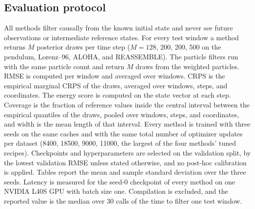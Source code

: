 \subsection{Evaluation protocol}\label{app:protocol}
All methods filter causally from the known initial state and never see future observations or intermediate reference states. For every test window a method returns $M$ posterior draws per time step ($M=128$, 200, 200, 500 on the pendulum, Lorenz--96, ALOHA, and REASSEMBLE). The particle filters run with the same particle count and return $M$ draws from the weighted particles. RMSE is computed per window and averaged over windows. CRPS is the empirical marginal CRPS of the draws, averaged over windows, steps, and coordinates. The energy score is computed on the state vector at each step. Coverage is the fraction of reference values inside the central interval between the empirical quantiles of the draws, pooled over windows, steps, and coordinates, and width is the mean length of that interval. Every method is trained with three seeds on the same caches and with the same total number of optimizer updates per dataset (8400, 18500, 9000, 11000, the largest of the four methods' tuned recipes). Checkpoints and hyperparameters are selected on the validation split, by the lowest validation RMSE unless stated otherwise, and no post-hoc calibration is applied. Tables report the mean and sample standard deviation over the three seeds. Latency is measured for the seed-0 checkpoint of every method on one NVIDIA L40S GPU with batch size one. Compilation is excluded, and the reported value is the median over 30 calls of the time to filter one test window.

\subsection{\method}\label{app:normflowsde}
